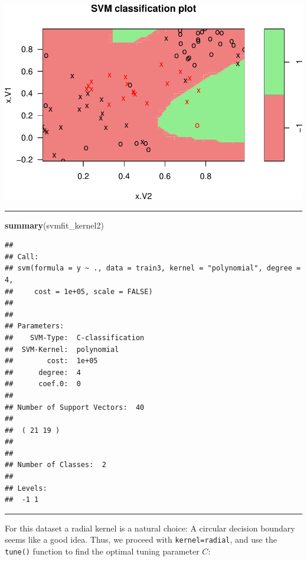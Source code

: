 \documentclass[]{article}
\newenvironment{Shaded}{\begin{snugshade}}{\end{snugshade}}
\newcommand{\KeywordTok}[1]{\textcolor[rgb]{0.13,0.29,0.53}{\textbf{#1}}}
\newcommand{\NormalTok}[1]{#1}
\begin{document}
\includegraphics{9SVM_files/figure-latex/unnamed-chunk-22-1.pdf}

\begin{center}\rule{0.5\linewidth}{\linethickness}\end{center}

\begin{Shaded}
\begin{Highlighting}[]
\KeywordTok{summary}\NormalTok{(svmfit_kernel2)}
\end{Highlighting}
\end{Shaded}

\begin{verbatim}
## 
## Call:
## svm(formula = y ~ ., data = train3, kernel = "polynomial", degree = 4, 
##     cost = 1e+05, scale = FALSE)
## 
## 
## Parameters:
##    SVM-Type:  C-classification 
##  SVM-Kernel:  polynomial 
##        cost:  1e+05 
##      degree:  4 
##      coef.0:  0 
## 
## Number of Support Vectors:  40
## 
##  ( 21 19 )
## 
## 
## Number of Classes:  2 
## 
## Levels: 
##  -1 1
\end{verbatim}

\normalsize

\begin{center}\rule{0.5\linewidth}{\linethickness}\end{center}

For this dataset a radial kernel is a natural choice: A circular
decision boundary seems like a good idea. Thus, we proceed with
\texttt{kernel=\textquotesingle{}radial\textquotesingle{}}, and use the
\texttt{tune()} function to find the optimal tuning parameter \(C\):

\footnotesize
\end{document}

